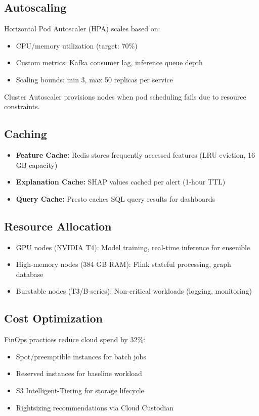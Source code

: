 \subsection{Autoscaling}
Horizontal Pod Autoscaler (HPA) scales based on:
\begin{itemize}
    \item CPU/memory utilization (target: 70\%)
    \item Custom metrics: Kafka consumer lag, inference queue depth
    \item Scaling bounds: min 3, max 50 replicas per service
\end{itemize}

Cluster Autoscaler provisions nodes when pod scheduling fails due to resource constraints.

\subsection{Caching}
\begin{itemize}
    \item \textbf{Feature Cache:} Redis stores frequently accessed features (LRU eviction, 16 GB capacity)
    \item \textbf{Explanation Cache:} SHAP values cached per alert (1-hour TTL)
    \item \textbf{Query Cache:} Presto caches SQL query results for dashboards
\end{itemize}

\subsection{Resource Allocation}
\begin{itemize}
    \item GPU nodes (NVIDIA T4): Model training, real-time inference for ensemble
    \item High-memory nodes (384 GB RAM): Flink stateful processing, graph database
    \item Burstable nodes (T3/B-series): Non-critical workloads (logging, monitoring)
\end{itemize}

\subsection{Cost Optimization}
FinOps practices reduce cloud spend by 32\%:
\begin{itemize}
    \item Spot/preemptible instances for batch jobs
    \item Reserved instances for baseline workload
    \item S3 Intelligent-Tiering for storage lifecycle
    \item Rightsizing recommendations via Cloud Custodian
\end{itemize}

